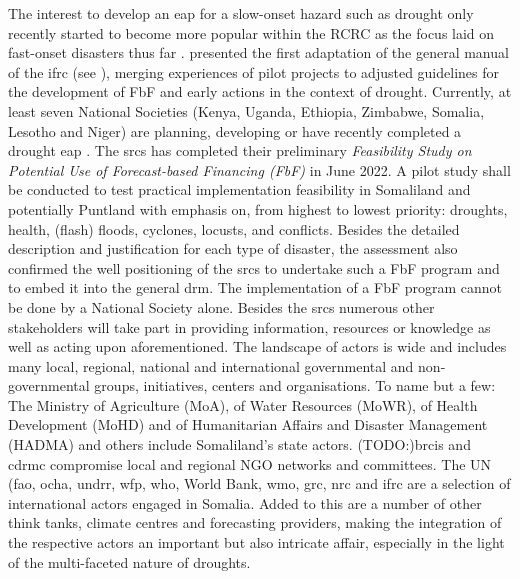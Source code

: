 The interest to develop an \acrshort*{eap} for a slow-onset hazard such as drought only recently started to become more popular within the RCRC as the focus laid on fast-onset disasters thus far \autocite{rcrcFORECASTBASEDFINANCINGEARLY2020}. \autocite{rcrcFORECASTBASEDFINANCINGEARLY2020} presented the first adaptation of the general manual of the \acrshort{ifrc} (see \autocite{ifrcFbFPractitionersManual2023b}), merging experiences of pilot projects to adjusted guidelines for the development of FbF and early actions in the context of drought. Currently, at least seven National Societies (Kenya, Uganda, Ethiopia, Zimbabwe, Somalia, Lesotho and Niger) are planning, developing or have recently completed a drought \acrshort*{eap} \autocite{lesothoredcrosssocietyEARLYACTIONPROTOCOL2022,nigerredcrosssocietyNigerDroughtEarly2021,rcrcFORECASTBASEDFINANCINGEARLY2020}.
The \acrfull*{srcs} has completed their preliminary \textit{Feasibility Study on Potential Use of Forecast-based Financing (FbF)} in June 2022. A pilot study shall be conducted to test practical implementation feasibility in Somaliland and potentially Puntland with emphasis on, from highest to lowest priority: droughts, health, (flash) floods, cyclones, locusts, and conflicts. Besides the detailed description and justification for each type of disaster, the assessment also confirmed the well positioning of the \acrshort*{srcs} to undertake such a FbF program and to embed it into the general \acrlong*{drm}.
The implementation of a FbF program cannot be done by a National Society alone. Besides the \acrshort*{srcs} numerous other stakeholders will take part in providing information, resources or knowledge as well as acting upon aforementioned. The landscape of actors is wide and includes many local, regional, national and international governmental and non-governmental groups, initiatives, centers and organisations. To name but a few: The Ministry of Agriculture (MoA), of Water Resources (MoWR), of Health Development (MoHD) and of Humanitarian Affairs and Disaster Management (HADMA) and others include Somaliland's state actors. (TODO:)\acrfull{brcis} and \acrfull{cdrmc} compromise local and regional NGO networks and committees. The UN (\acrshort{fao}, \acrshort{ocha}, \acrshort{undrr}, \acrshort{wfp}, \acrshort{who}, World Bank, \acrshort{wmo}, \acrshort{grc}, \acrshort{nrc} and \acrshort{ifrc} are a selection of international actors engaged in Somalia. Added to this are a number of other think tanks, climate centres and forecasting providers, making the integration of the respective actors an important but also intricate affair, especially in the light of the multi-faceted nature of droughts\autocite{rcrcFORECASTBASEDFINANCINGEARLY2020,somaliredcrescentsocietyFeasibilityStudyPotential2022}. 

